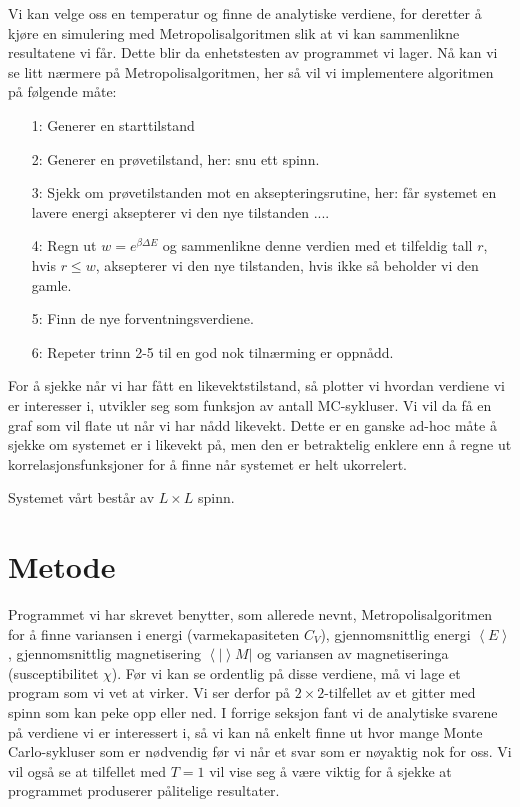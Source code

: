 \documentclass[norsk, 10pt]{article}
\def\mean#1{\left\langle #1 \right\rangle}
\begin{document}
Vi kan velge oss en temperatur og finne de analytiske verdiene, for deretter å kjøre en simulering med Metropolisalgoritmen slik at vi kan sammenlikne resultatene vi får. Dette blir da enhetstesten av programmet vi lager. Nå kan vi se litt nærmere på Metropolisalgoritmen, her så vil vi implementere algoritmen på følgende måte:
\begin{itemize}
\item[1:] Generer en starttilstand
\item[2:] Generer en prøvetilstand, her: snu ett spinn.
\item[3:] Sjekk om prøvetilstanden mot en aksepteringsrutine, her: får systemet en lavere energi aksepterer vi den nye tilstanden ....
\item[4:] Regn ut $w=e^{\beta\Delta E}$ og sammenlikne denne verdien med et tilfeldig tall $r$, hvis $r\leq w$, aksepterer vi den nye tilstanden, hvis ikke så beholder vi den gamle.
\item[5:] Finn de nye forventningsverdiene.
\item[6:] Repeter trinn 2-5 til en god nok tilnærming er oppnådd.
\end{itemize}
For å sjekke når vi har fått en likevektstilstand, så plotter vi hvordan verdiene vi er interesser i, utvikler seg som funksjon av antall MC-sykluser. Vi vil da få en graf som vil flate ut når vi har nådd likevekt. Dette er en ganske ad-hoc måte å sjekke om systemet er i likevekt på, men den er betraktelig enklere enn å regne ut korrelasjonsfunksjoner for å finne når systemet er helt ukorrelert.

Systemet vårt består av $L\times L$ spinn.


\section*{Metode}
Programmet vi har skrevet benytter, som allerede nevnt, Metropolisalgoritmen for å finne variansen i energi (varmekapasiteten $C_V$), gjennomsnittlig energi $\mean E$, gjennomsnittlig magnetisering $\mean |M|$ og variansen av magnetiseringa (susceptibilitet $\chi$). Før vi kan se ordentlig på disse verdiene, må vi lage et program som vi vet at virker. Vi ser derfor på $2\times2$-tilfellet av et gitter med spinn som kan peke opp eller ned. I forrige seksjon fant vi de analytiske svarene på verdiene vi er interessert i, så vi kan nå enkelt finne ut hvor mange Monte Carlo-sykluser som er nødvendig før vi når et svar som er nøyaktig nok for oss. Vi vil også se at tilfellet med $T=1$ vil vise seg å være viktig for å sjekke at programmet produserer pålitelige resultater.
\end{document}
